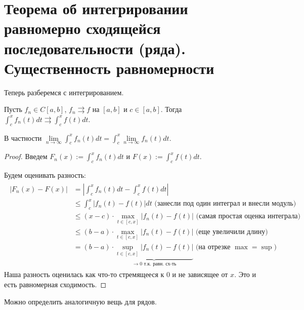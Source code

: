 \section{Теорема об интегрировании равномерно сходящейся последовательности (ряда). Существенность равномерности}
Теперь разберемся с интегрированием.

\begin{theorem}
    Пусть $f_n \in C[a, b]$, $f_n \rightrightarrows f$ на $[a, b]$ и $c \in [a, b]$. 
    Тогда $\int_c^x f_n(t)dt \rightrightarrows \int_c^x f(t)dt$.

    В частности $\lim\limits_{n \to \infty} \int_c^x f_n(t)dt = \int_c^x \lim\limits_{n \to \infty} f_n(t)dt$.
\end{theorem}

\begin{proof}
    Введем $F_n(x) := \int_c^x f_n(t)dt$ и $F(x) := \int_c^x f(t)dt $. 
    
    \quad Будем оценивать разность:
    \begin{gather*}
        \begin{split}
            |F_n(x) - F(x)| &= \left|\int_c^x f_n(t)dt - \int_c^x f(t)dt \right| \\
            &\leqslant \int_c^x |f_n(t) - f(t)|dt \text{ (занесли под один интеграл и внесли модуль) } \\
            &\leqslant (x - c) \cdot \max_{t \in [c, x]} |f_n(t) - f(t)| \text{ (самая простая оценка интеграла) } \\
            &\leqslant (b - a) \cdot \max_{t \in [c, x]} |f_n(t) - f(t)| \text{ (еще увеличили длину) }\\
            &= (b - a) \cdot \underbrace{\sup_{t \in [c, x]} |f_n(t) - f(t)|}_{\to 0 \text{ т.к. равн. сх-ть}} \text{ (на отрезке $\max = \sup$) }
        \end{split}
    \end{gather*}
    Наша разность оценилась как что-то стремящееся к 0 и не зависящее от $x$. Это и есть равномерная сходимость.
\end{proof}

\vspace*{7mm}

Можно определить аналогичную вещь для рядов.

